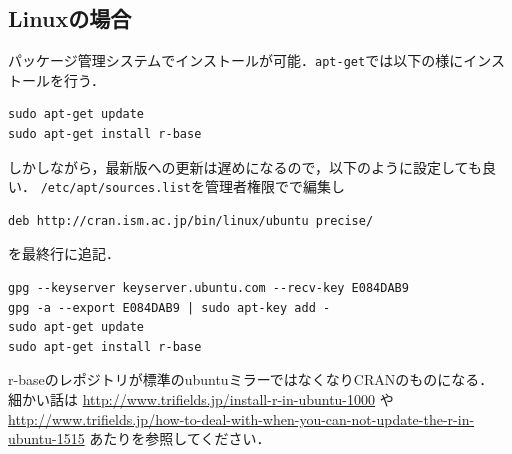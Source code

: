 \subsection{Linuxの場合}
パッケージ管理システムでインストールが可能．\verb+apt-get+では以下の様にインストールを行う．
\begin{breakbox}
\begin{verbatim}
sudo apt-get update
sudo apt-get install r-base
\end{verbatim}
\end{breakbox}
しかしながら，最新版への更新は遅めになるので，以下のように設定しても良い．
\verb+/etc/apt/sources.list+を管理者権限でで編集し
\begin{breakbox}
\begin{verbatim}
deb http://cran.ism.ac.jp/bin/linux/ubuntu precise/
\end{verbatim}
\end{breakbox}
を最終行に追記．
\begin{breakbox}
\begin{verbatim}
gpg --keyserver keyserver.ubuntu.com --recv-key E084DAB9
gpg -a --export E084DAB9 | sudo apt-key add -
sudo apt-get update
sudo apt-get install r-base
\end{verbatim}
\end{breakbox}
r-baseのレポジトリが標準のubuntuミラーではなくなりCRANのものになる．\\
細かい話は \url{http://www.trifields.jp/install-r-in-ubuntu-1000} や\\ \url{http://www.trifields.jp/how-to-deal-with-when-you-can-not-update-the-r-in-ubuntu-1515} あたりを参照してください．
